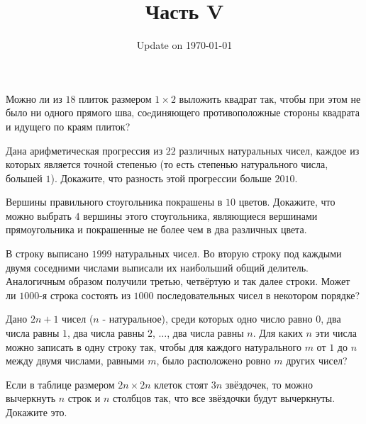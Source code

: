 \documentclass[12pt]{article}
\begin{document}
\fontsize{12}{12}\selectfont

\title{\bf \huge Часть V}
\date{Update on \today}
\maketitle 

\begin{task}
Можно ли из $18$ плиток размером $1 \times 2$ выложить квадрат так, чтобы при этом не было ни одного прямого шва, соeдиняющего противоположные стороны квадрата и идущего по краям плиток?
\end{task}

\begin{task}
Дана арифметическая прогрессия из $22$ различных натуральных чисел, каждое из которых является точной степенью (то есть степенью натурального числа, большей $1$). Докажите, что разность этой прогрессии больше $2010$.
\end{task}

\begin{task}
Вершины правильного стоугольника покрашены в $10$ цветов. Докажите, что можно выбрать $4$ вершины этого стоугольника, являющиеся вершинами прямоугольника и покрашенные не более чем в два различных цвета.
\end{task}

\begin{task}
В строку выписано $1999$ натуральных чисел. Во вторую строку под каждыми двумя соседними числами выписали их наибольший общий делитель. Аналогичным образом получили третью, четвёртую и так далее строки. Может ли $1000$-я строка состоять из $1000$ последовательных чисел в некотором порядке? 
\end{task}

\begin{task}
Дано $2n + 1$ чисел ($n$ - натуральное), среди которых одно число равно $0$, два числа равны $1$, два числа равны $2$, $\dots$, два числа равны $n$. Для каких $n$ эти числа можно записать в одну строку так, чтобы для каждого натурального $m$ от $1$ до $n$ между двумя числами, равными $m$, было расположено ровно  $m$ других чисел?
\end{task}

\begin{task}
Если в таблице размером $2n \times 2n$ клеток стоят $3n$ звёздочек, то можно вычеркнуть $n$ строк и $n$ столбцов так, что все звёздочки будут вычеркнуты. Докажите это.
\end{task}
\end{document}
